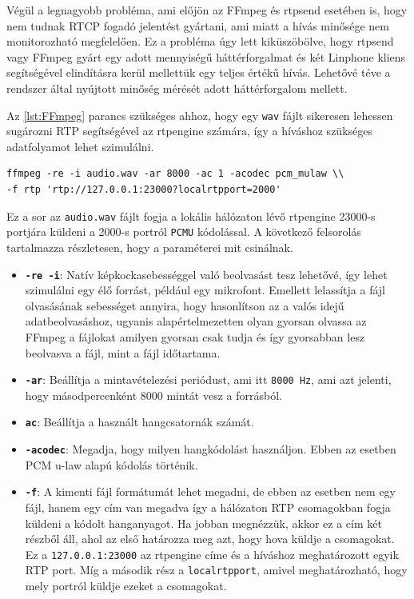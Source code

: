 Végül a legnagyobb probléma, ami előjön az FFmpeg és rtpsend esetében is, hogy nem
tudnak RTCP fogadó jelentést gyártani, ami miatt a hívás minősége nem monitorozható 
megfelelően. Ez a probléma úgy lett kiküszöbölve, hogy rtpsend vagy FFmpeg gyárt
egy adott mennyiségű háttérforgalmat és két Linphone kliens segítségével elindításra 
kerül mellettük egy teljes értékű hívás.  Lehetővé téve a rendszer által nyújtott minőség 
mérését adott háttérforgalom mellett. 

Az \ref{lst:FFmpeg} parancs szükséges ahhoz, hogy egy \texttt{wav} fájlt sikeresen 
lehessen sugározni RTP segítségével az rtpengine számára, így a híváshoz szükséges 
adatfolyamot lehet szimulálni. 

\begin{lstlisting}[caption=FFmpeg RTP folyam indtása, label=lst:FFmpeg]
ffmpeg -re -i audio.wav -ar 8000 -ac 1 -acodec pcm_mulaw \\
-f rtp 'rtp://127.0.0.1:23000?localrtpport=2000'
\end{lstlisting}

Ez a sor az \texttt{audio.wav} fájlt fogja a lokális hálózaton lévő rtpengine 23000-s
portjára küldeni a 2000-s portról \texttt{PCMU} kódolással. A következő felsorolás 
tartalmazza részletesen, hogy a paraméterei mit csinálnak.

\begin{itemize}
	\item \textbf{\texttt{-re -i}}: Natív képkockasebességgel való beolvasást tesz 
	lehetővé, így lehet szimulálni egy élő forrást, például egy mikrofont. Emellett 
	lelassítja a fájl olvasásának sebességet annyira, hogy hasonlítson az a valós idejű 
	adatbeolvasáshoz, ugyanis alapértelmezetten olyan gyorsan olvassa az FFmpeg a 
	fájlokat amilyen gyorsan csak tudja és így gyorsabban lesz beolvasva a fájl, mint a 
	fájl időtartama. 
	\item \textbf{\texttt{-ar}}: Beállítja a mintavételezési periódust, ami itt 
	\texttt{8000 Hz}, ami azt jelenti, hogy másodpercenként 8000 mintát vesz a forrásból. 
	\item \textbf{\texttt{ac}}: Beállítja a használt hangcsatornák számát.
	\item \textbf{\texttt{-acodec}}: Megadja, hogy milyen hangkódolást használjon. Ebben 
	az esetben PCM u-law alapú kódolás történik.
	\item \textbf{\texttt{-f}}: A kimenti fájl formátumát lehet megadni, de ebben az 
	esetben nem egy fájl, hanem egy cím van megadva így a hálózaton RTP csomagokban fogja 
	küldeni a kódolt hanganyagot. Ha jobban megnézzük, akkor ez a cím két részből áll,
	ahol az első határozza meg azt, hogy hova küldje a csomagokat. Ez a 
	\texttt{127.0.0.1:23000} az rtpengine címe és a híváshoz meghatározott egyik RTP
	port. Míg a második rész a \texttt{localrtpport}, amivel meghatározható, hogy mely 
	portról küldje ezeket a csomagokat.
\end{itemize}

